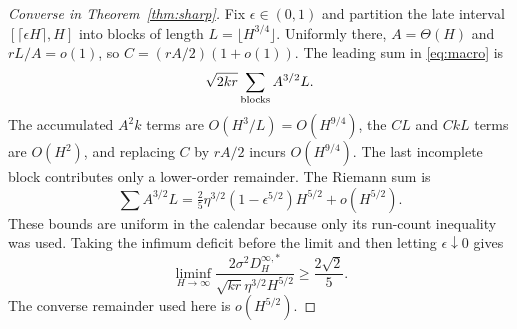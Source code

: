 \begin{proof}[Converse in Theorem~\ref{thm:sharp}]
Fix $\epsilon\in(0,1)$ and partition the late interval $[\lceil\epsilon H\rceil,H]$ into blocks of length $L=\lfloor H^{3/4}\rfloor$. Uniformly there, $A=\Theta(H)$ and $rL/A=o(1)$, so $C=(rA/2)(1+o(1))$. The leading sum in \eqref{eq:macro} is
\begin{equation}
 \sqrt{2kr}\sum_{\rm blocks}A^{3/2}L.
\end{equation}
The accumulated $A^2k$ terms are $O(H^3/L)=O(H^{9/4})$, the $CL$ and $CkL$ terms are $O(H^2)$, and replacing $C$ by $rA/2$ incurs $O(H^{9/4})$. The last incomplete block contributes only a lower-order remainder. The Riemann sum is
\begin{equation}
 \sum A^{3/2}L
 =\tfrac25\eta^{3/2}(1-\epsilon^{5/2})H^{5/2}+o(H^{5/2}).
\end{equation}
These bounds are uniform in the calendar because only its run-count inequality was used. Taking the infimum deficit before the limit and then letting $\epsilon\downarrow0$ gives
\begin{equation}
 \liminf_{H\to\infty}
 \frac{2\sigma^2D_H^{\infty,*}}{\sqrt{kr}\eta^{3/2}H^{5/2}}
 \ge\frac{2\sqrt2}{5}.\label{eq:sharp_lower}
\end{equation}
The converse remainder used here is $o(H^{5/2})$.
\end{proof}

